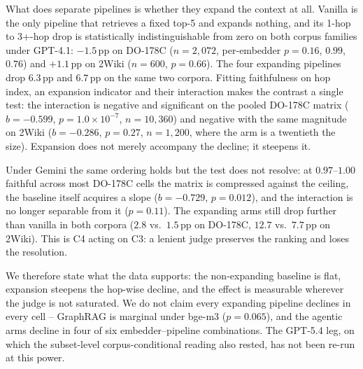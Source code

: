 What does separate pipelines is whether they expand the context at all.
Vanilla is the only pipeline that retrieves a fixed top-5 and expands
nothing, and its 1-hop to 3+-hop drop is statistically indistinguishable
from zero on both corpus families under GPT-4.1: ${-}1.5$\,pp on DO-178C
($n{=}2{,}072$, per-embedder $p{=}0.16$, $0.99$, $0.76$) and $+1.1$\,pp
on 2Wiki ($n{=}600$, $p{=}0.66$). The four expanding pipelines drop
$6.3$\,pp and $6.7$\,pp on the same two corpora. Fitting faithfulness on
hop index, an expansion indicator and their interaction makes the
contrast a single test: the interaction is negative and significant on
the pooled DO-178C matrix ($b{=}{-}0.599$, $p{=}1.0{\times}10^{-7}$,
$n{=}10{,}360$) and negative with the same magnitude on 2Wiki
($b{=}{-}0.286$, $p{=}0.27$, $n{=}1{,}200$, where the arm is a
twentieth the size). Expansion does not merely accompany the decline; it
steepens it.

Under Gemini the same ordering holds but the test does not resolve: at
$0.97$--$1.00$ faithful across most DO-178C cells the matrix is
compressed against the ceiling, the baseline itself acquires a slope
($b{=}{-}0.729$, $p{=}0.012$), and the interaction is no longer separable
from it ($p{=}0.11$). The expanding arms still drop further than vanilla
in both corpora ($2.8$ vs.\ $1.5$\,pp on DO-178C, $12.7$ vs.\ $7.7$\,pp
on 2Wiki). This is C4 acting on C3: a lenient judge preserves the
ranking and loses the resolution.

We therefore state what the data supports: the non-expanding baseline is
flat, expansion steepens the hop-wise decline, and the effect is
measurable wherever the judge is not saturated. We do not claim every
expanding pipeline declines in every cell -- GraphRAG is marginal under
bge-m3 ($p{=}0.065$), and the agentic arms decline in four of six
embedder--pipeline combinations. The GPT-5.4 leg, on which the subset-level
corpus-conditional reading also rested, has not been re-run at this power.


